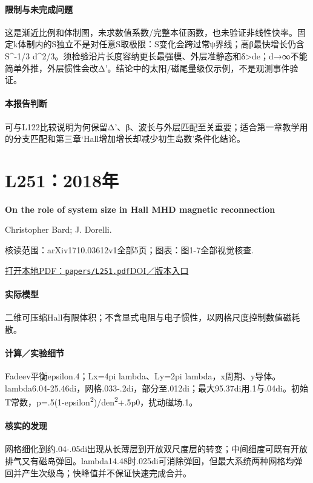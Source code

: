 \paragraph{限制与未完成问题}这是渐近比例和体制图，未求数值系数/完整本征函数，也未验证非线性快率。固定k体制内的S独立不是对任意S取极限：S变化会跨过常ψ界线；高β最快增长仍含S\textasciicircum{}-1/3 d\textasciicircum{}2/3。须检验沿片长度容纳更长最强模、外层准静态和δ>de；d→∞不能简单外推，外层惯性会改Δ'。结论中的太阳/磁尾量级仅示例，不是观测事件验证。

\paragraph{本报告判断}可与L122比较说明为何保留Δ'、β、波长与外层匹配至关重要；适合第一章教学用的分支匹配和第三章‘Hall增加增长却减少初生岛数’条件化结论。

\section{L251：2018年}\label{paper:L251}

\textbf{On the role of system size in Hall MHD magnetic reconnection}\citep{L251}\

Christopher Bard;  J. Dorelli.

\textsf{核读范围：}arXiv1710.03612v1全部5页；\textsf{图表：}图1-7全部视觉核查.

\href{run:papers/L251.pdf}{打开本地PDF：\texttt{papers/L251.pdf}}\quad\href{https://doi.org/10.1063/1.5010785}{DOI／版本入口}

\paragraph{实际模型}二维可压缩Hall有限体积；不含显式电阻与电子惯性，以网格尺度控制数值磁耗散。

\paragraph{计算／实验细节}Fadeev平衡epsilon.4；Lx=4pi lambda、Ly=2pi lambda，x周期、y导体。lambda6.04-25.46di，网格.033-.2di，部分至.012di；最大95.37di用.1与.04di。初始T常数，p=.5(1-epsilon\textsuperscript{2})/den\textsuperscript{2}+.5p0，扰动磁场.1。

\paragraph{核实的发现}网格细化到约.04-.05di出现从长薄层到开放双尺度层的转变；中间细度可既有开放排气又有磁岛弹回。lambda14.48时.025di可消除弹回，但最大系统两种网格均弹回并产生次级岛；快峰值并不保证快速完成合并。

